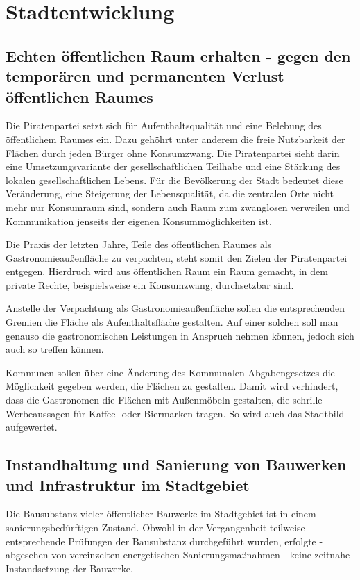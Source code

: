\chapter{Stadtentwicklung}

  \section{Echten öffentlichen Raum erhalten - gegen den temporären und 
  permanenten Verlust öffentlichen Raumes}
  
  Die Piratenpartei setzt sich für Aufenthaltsqualität und eine Belebung des 
  öffentlichem Raumes ein. Dazu gehöhrt unter anderem die freie Nutzbarkeit 
  der Flächen durch jeden Bürger ohne Konsumzwang. Die Piratenpartei sieht 
  darin eine Umsetzungsvariante der gesellschaftlichen Teilhabe und eine 
  Stärkung des lokalen gesellschaftlichen Lebens. Für die Bevölkerung der 
  Stadt bedeutet diese Veränderung, eine Steigerung der Lebensqualität, da die 
  zentralen Orte nicht mehr nur Konsumraum sind, sondern auch Raum zum 
  zwanglosen verweilen und Kommunikation jenseits der eigenen 
  Konsummöglichkeiten ist.
  
  Die Praxis der letzten Jahre, Teile des öffentlichen Raumes als 
  Gastronomieaußenfläche zu verpachten, steht somit den Zielen der 
  Piratenpartei entgegen. Hierdruch wird aus öffentlichen Raum ein Raum 
  gemacht, in dem private Rechte, beispielsweise ein Konsumzwang, durchsetzbar 
  sind.
  
  Anstelle der Verpachtung als Gastronomieaußenfläche sollen die 
  entsprechenden Gremien die Fläche als Aufenthaltsfläche gestalten. Auf einer 
  solchen soll man genauso die gastronomischen Leistungen in Anspruch nehmen 
  können, jedoch sich auch so treffen können.
  
  Kommunen sollen über eine Änderung des Kommunalen Abgabengesetzes die 
  Möglichkeit gegeben werden, die Flächen zu gestalten. Damit wird verhindert, 
  dass die Gastronomen die Flächen mit Außenmöbeln gestalten, die schrille 
  Werbeaussagen für Kaffee- oder Biermarken tragen. So wird auch das Stadtbild 
  aufgewertet.
  
  \section{Instandhaltung und Sanierung von Bauwerken und Infrastruktur im 
  Stadtgebiet}
  
  Die Bausubstanz vieler öffentlicher Bauwerke im Stadtgebiet ist in einem 
  sanierungsbedürftigen Zustand. Obwohl in der Vergangenheit teilweise 
  entsprechende Prüfungen der Bausubstanz durchgeführt wurden, erfolgte - 
  abgesehen von vereinzelten energetischen Sanierungsmaßnahmen - keine 
  zeitnahe Instandsetzung der Bauwerke.
  
